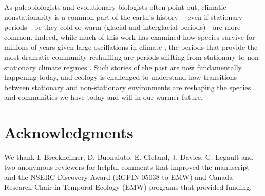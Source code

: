 \documentclass[11pt,letterpaper]{article}
\begin{document}
As paleobiologists and evolutionary biologists often point out, climatic nonstationarity is a common part of the earth's history \citep{Jansson:2002nz}---even if stationary periods---be they cold or warm (glacial and interglacial periods)---are more common. Indeed, while much of this work has examined how species survive for millions of years given large oscillations in climate \citep{provan2008}, the periods that provide the most dramatic community reshuffling are periods shifting from stationary to non-stationary climate regimes \citep{vrba1980,vrba1985}. Such stories of the past are now fundamentally happening today, and ecology is challenged to understand how transitions between stationary and non-stationary environments are reshaping the species and communities we have today and will in our warmer future. 

\section{Acknowledgments}
We thank I. Breckheimer, D. Buonaiuto, E. Cleland, J. Davies, G. Legault and two anonymous reviewers for helpful comments that improved the manuscript and the NSERC Discovery Award (RGPIN-05038 to EMW) and Canada Research Chair in Temporal Ecology (EMW) programs that provided funding. 


\end{document}

